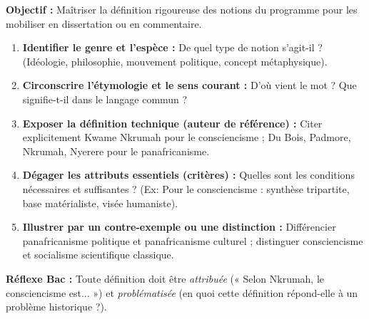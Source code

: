 \documentclass[11pt]{article}
\newcommand{\cle}[1]{{\popxbold\color{popdark}#1}}
\begin{document}
\begin{methode}
\textbf{Objectif :} Maîtriser la définition rigoureuse des notions du programme pour les mobiliser en dissertation ou en commentaire.
\begin{enumerate}
    \item \textbf{Identifier le genre et l'espèce :} De quel type de notion s'agit-il ? (Idéologie, philosophie, mouvement politique, concept métaphysique).
    \item \textbf{Circonscrire l'étymologie et le sens courant :} D'où vient le mot ? Que signifie-t-il dans le langage commun ?
    \item \textbf{Exposer la définition technique (auteur de référence) :} Citer explicitement \cle{Kwame Nkrumah} pour le consciencisme ; \cle{Du Bois}, \cle{Padmore}, \cle{Nkrumah}, \cle{Nyerere} pour le panafricanisme.
    \item \textbf{Dégager les attributs essentiels (critères) :} Quelles sont les conditions nécessaires et suffisantes ? (Ex: Pour le consciencisme : synthèse tripartite, base matérialiste, visée humaniste).
    \item \textbf{Illustrer par un contre-exemple ou une distinction :} Différencier panafricanisme politique et panafricanisme culturel ; distinguer consciencisme et socialisme scientifique classique.
\end{enumerate}
\textbf{Réflexe Bac :} Toute définition doit être \emph{attribuée} (« Selon Nkrumah, le consciencisme est... ») et \emph{problématisée} (en quoi cette définition répond-elle à un problème historique ?).
\end{methode}
\end{document}
